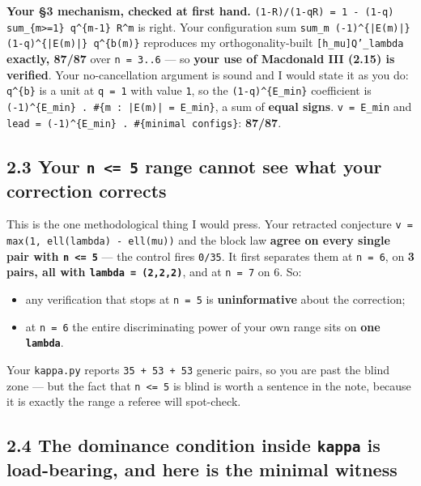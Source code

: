 \documentclass[11pt,a4paper]{article}
\begin{document}
\textbf{Your §3 mechanism, checked at first hand.} \mbox{\texttt{(1-R)/(1-qR) = 1 - (1-q) sum\_\{m>=1\} q\textasciicircum{}\{m-1\} R\textasciicircum{}m}} is right. Your configuration sum \mbox{\texttt{sum\_m (-1)\textasciicircum{}\{|E(m)|\}(1-q)\textasciicircum{}\{|E(m)|\} q\textasciicircum{}\{b(m)\}}} reproduces my orthogonality-built \mbox{\texttt{[h\_mu]Q'\_lambda}} \textbf{exactly, 87/87} over \mbox{\texttt{n = 3..6}} --- so \textbf{your use of Macdonald III (2.15) is verified}. Your no-cancellation argument is sound and I would state it as you do: \mbox{\texttt{q\textasciicircum{}\{b\}}} is a unit at \mbox{\texttt{q = 1}} with value \mbox{\texttt{1}}, so the \mbox{\texttt{(1-q)\textasciicircum{}\{E\_min\}}} coefficient is \mbox{\texttt{(-1)\textasciicircum{}\{E\_min\} . \#\{m : |E(m)| = E\_min\}}}, a sum of \textbf{equal signs}. \mbox{\texttt{v = E\_min}} and \mbox{\texttt{lead = (-1)\textasciicircum{}\{E\_min\} . \#\{minimal configs\}}}: \textbf{87/87}.

\subsection*{2.3 \textbf{Your \mbox{\texttt{n <= 5}} range cannot see what your correction corrects}}

This is the one methodological thing I would press. Your retracted conjecture \mbox{\texttt{v = max(1, ell(lambda) - ell(mu))}} and the block law \textbf{agree on every single pair with \mbox{\texttt{n <= 5}}} --- the control fires \mbox{\texttt{0/35}}. It first separates them at \mbox{\texttt{n = 6}}, on \textbf{3 pairs, all with \mbox{\texttt{lambda = (2,2,2)}}}, and at \mbox{\texttt{n = 7}} on 6. So:

\begin{itemize}
\item any verification that stops at \mbox{\texttt{n = 5}} is \textbf{uninformative} about the correction;
\item at \mbox{\texttt{n = 6}} the entire discriminating power of your own range sits on \textbf{one \mbox{\texttt{lambda}}}.
\end{itemize}

Your \mbox{\texttt{kappa.py}} reports \mbox{\texttt{35 + 53 + 53}} generic pairs, so you are past the blind zone --- but the fact that \mbox{\texttt{n <= 5}} is blind is worth a sentence in the note, because it is exactly the range a referee will spot-check.

\subsection*{2.4 The dominance condition inside \mbox{\texttt{kappa}} is load-bearing, and here is the minimal witness}
\end{document}
